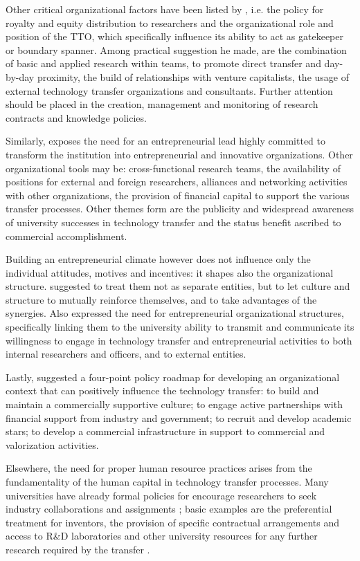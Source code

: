 Other critical organizational factors have been listed by \citet{Debackere2005}, i.e. the policy for royalty and equity distribution to researchers and the organizational role and position of the TTO, which specifically influence its ability to act as gatekeeper or boundary spanner. Among practical suggestion he made, are the combination of basic and applied research within teams, to promote direct transfer and day-by-day proximity, the build of relationships with venture capitalists, the usage of external technology transfer organizations and consultants. Further attention should be placed in the creation, management and monitoring of research contracts and knowledge policies.

Similarly, \citet{Guerrero2014} exposes the need for an entrepreneurial lead highly committed to transform the institution into entrepreneurial and innovative organizations. Other organizational tools may be: cross-functional research teams, the availability of positions for external and foreign researchers, alliances and networking activities with other organizations, the provision of financial capital to support the various transfer processes. Other themes form \citet{OwenSmith2001} are the publicity and widespread awareness of university successes in technology transfer and the status benefit ascribed to commercial accomplishment.

Building an entrepreneurial climate however does not influence only the individual attitudes, motives and incentives: it shapes also the organizational structure. \citet{Rasmussen2006} suggested to treat them not as separate entities, but to let culture and structure to mutually reinforce themselves, and to take advantages of the synergies. Also \citet{Guerrero2014} expressed the need for entrepreneurial organizational structures, specifically linking them to the university ability to transmit and communicate its willingness to engage in technology transfer and entrepreneurial activities to both internal researchers and officers, and to external entities.  

Lastly, \citet{OShea2005} suggested a four-point policy roadmap for developing an organizational context that can positively influence the technology transfer: to build and maintain a commercially supportive culture; to engage active partnerships with financial support from industry and government; to recruit and develop academic stars; to develop a commercial infrastructure in support to commercial and valorization activities.

Elsewhere, the need for proper human resource practices arises from the fundamentality of the human capital in technology transfer processes. Many universities have already formal policies for encourage researchers to seek industry collaborations and assignments \citep{DEste2011}; basic examples are the preferential treatment for inventors, the provision of specific contractual arrangements and access to R\&D laboratories and other university resources for any further research required by the transfer \citep{Fini2009}.

